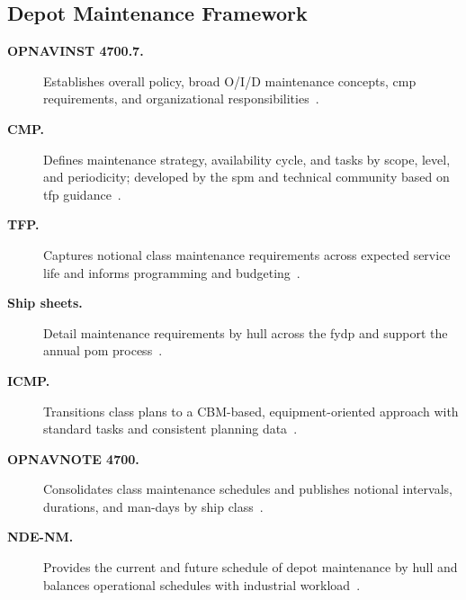 \documentclass[../main.tex]{subfiles}
\begin{document}
\subsection{Depot Maintenance Framework}
\begin{description}
  \item[\textbf{OPNAVINST 4700.7.}] Establishes overall policy, broad O/I/D maintenance concepts, \ac{cmp} requirements, and organizational responsibilities~\autocite{OPNAVINST4700-7N,edo-4-1-3-fleet-maint-policy-2025}.
  \item[\textbf{CMP.}] Defines maintenance strategy, availability cycle, and tasks by scope, level, and periodicity; developed by the \ac{spm} and technical community based on \ac{tfp} guidance~\autocite{OPNAVINST4700-7N,edo-4-1-3-fleet-maint-policy-2025}.
  \item[\textbf{TFP.}] Captures notional class maintenance requirements across expected service life and informs programming and budgeting~\autocite{edo-4-1-3-fleet-maint-policy-2025}.
  \item[\textbf{Ship sheets.}] Detail maintenance requirements by hull across the \ac{fydp} and support the annual \ac{pom} process~\autocite{edo-4-1-3-fleet-maint-policy-2025}.
  \item[\textbf{ICMP.}] Transitions class plans to a CBM-based, equipment-oriented approach with standard tasks and consistent planning data~\autocite{edo-4-1-3-fleet-maint-policy-2025}.
  \item[\textbf{OPNAVNOTE 4700.}] Consolidates class maintenance schedules and publishes notional intervals, durations, and man-days by ship class~\autocite{edo-4-1-3-fleet-maint-policy-2025}.
  \item[\textbf{NDE-NM.}] Provides the current and future schedule of depot maintenance by hull and balances operational schedules with industrial workload~\autocite{edo-4-1-3-fleet-maint-policy-2025}.
\end{description}
\end{document}
